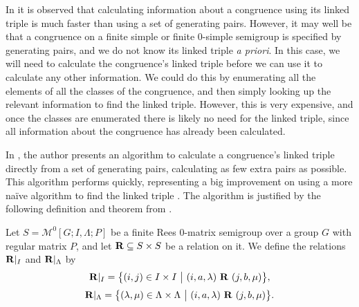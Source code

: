 In \cite[\S 6.1]{mtorpey_pre_msc} it is observed that calculating information
about a congruence using its linked triple is much faster than using a set of
generating pairs.  However, it may well be that a congruence on a finite
simple or finite 0-simple semigroup is specified by generating pairs, and we do
not know its linked triple \textit{a priori}.  In this case, we will need to
calculate the congruence's linked triple before we can use it to calculate any
other information.  We could do this by enumerating all the elements of all the
classes of the congruence, and then simply looking up the relevant information
to find the linked triple.  However, this is very expensive, and once the
classes are enumerated there is likely no need for the linked triple, since all
information about the congruence has already been calculated.

In \cite[\S 3.2]{mtorpey_msc}, the author presents an algorithm to calculate a
congruence's linked triple directly from a set of generating pairs, calculating
as few extra pairs as possible.  This algorithm performs quickly, representing a
big improvement on using a more na\"ive algorithm to find the linked triple
\cite[\S 6.1.2]{mtorpey_msc}.  The algorithm is justified by the following
definition and theorem from \cite{mtorpey_msc}.

\begin{definition}
  \label{def:ri}
  Let $S = \mathcal{M}^0[G;I,\Lambda;P]$ be a finite Rees 0-matrix semigroup
  over a group $G$ with regular matrix $P$, and let $\mathbf{R} \subseteq S \times S$ be
  a relation on it.  We define the relations $\mathbf{R}|_I$ and $\mathbf{R}|_\Lambda$ by
  $$\mathbf{R}|_I = \big\{(i,j) \in I \times I ~\big|~
  (i,a,\lambda) ~\mathbf{R}~ (j,b,\mu)\big\},$$
  $$\mathbf{R}|_\Lambda = \big\{(\lambda,\mu) \in \Lambda \times \Lambda ~\big|~
  (i,a,\lambda) ~\mathbf{R}~ (j,b,\mu)\big\}.$$
\end{definition}

